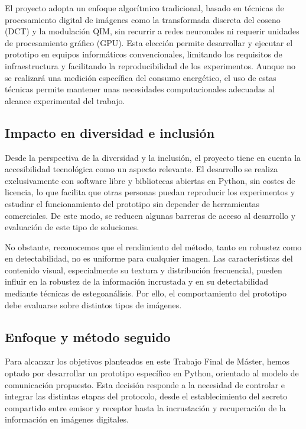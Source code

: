 \documentclass[IB]{TFUOC}%
\begin{document}
El proyecto adopta un enfoque algorítmico tradicional, basado en técnicas de procesamiento digital de imágenes como la transformada discreta del coseno (DCT) y la modulación QIM, sin recurrir a redes neuronales ni requerir unidades de procesamiento gráfico (GPU). Esta elección permite desarrollar y ejecutar el prototipo en equipos informáticos convencionales, limitando los requisitos de infraestructura y facilitando la reproducibilidad de los experimentos. Aunque no se realizará una medición específica del consumo energético, el uso de estas técnicas permite mantener unas necesidades computacionales adecuadas al alcance experimental del trabajo.

\subsection{Impacto en diversidad e inclusión}
\label{subsec:impacto_diversidad_inclusion}

Desde la perspectiva de la diversidad y la inclusión, el proyecto tiene en cuenta la accesibilidad tecnológica como un aspecto relevante. El desarrollo se realiza exclusivamente con software libre y bibliotecas abiertas en Python, sin costes de licencia, lo que facilita que otras personas puedan reproducir los experimentos y estudiar el funcionamiento del prototipo sin depender de herramientas comerciales. De este modo, se reducen algunas barreras de acceso al desarrollo y evaluación de este tipo de soluciones.

No obstante, reconocemos que el rendimiento del método, tanto en robustez como en detectabilidad, no es uniforme para cualquier imagen. Las características del contenido visual, especialmente su textura y distribución frecuencial, pueden influir en la robustez de la información incrustada y en su detectabilidad mediante técnicas de estegoanálisis. Por ello, el comportamiento del prototipo debe evaluarse sobre distintos tipos de imágenes.


\subsection{Enfoque y método seguido}
\label{subsec:enfoque_metodo}

Para alcanzar los objetivos planteados en este Trabajo Final de Máster, hemos optado por desarrollar un prototipo específico en Python, orientado al modelo de comunicación propuesto. Esta decisión responde a la necesidad de controlar e integrar las distintas etapas del protocolo, desde el establecimiento del secreto compartido entre emisor y receptor hasta la incrustación y recuperación de la información en imágenes digitales.
\end{document}
